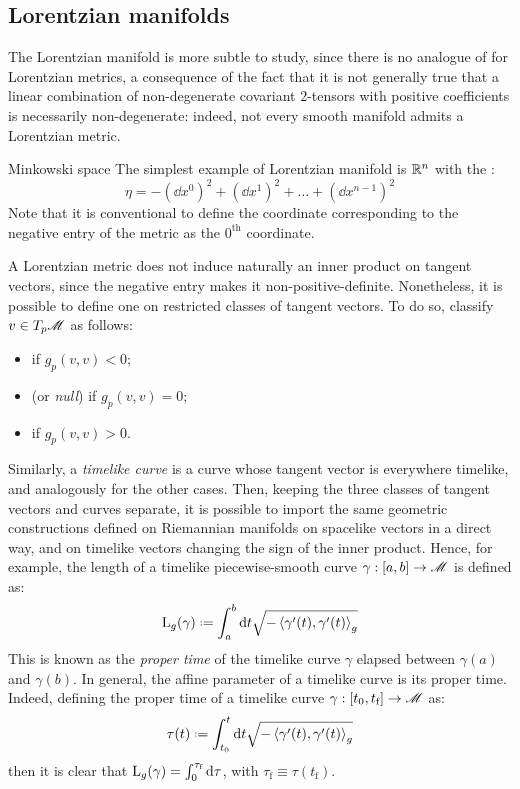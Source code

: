 \subsection{Lorentzian manifolds}

The Lorentzian manifold is more subtle to study, since there is no analogue of  for Lorentzian metrics, a consequence of the fact that it is not generally true that a linear combination of non-degenerate covariant $ 2 $-tensors with positive coefficients is necessarily non-degenerate: indeed, not every smooth manifold admits a Lorentzian metric.

\begin{example}{Minkowski space}{}
  The simplest example of Lorentzian manifold is $ \mathbb{R}^n $ with the :
  \begin{equation}
    \eta = - (\dd x^0)^2 + (\dd x^1)^2 + \dots + (\dd x^{n-1})^2
  \end{equation}
  Note that it is conventional to define the coordinate corresponding to the negative entry of the metric as the $ 0^\text{th} $ coordinate.
\end{example}

A Lorentzian metric does not induce naturally an inner product on tangent vectors, since the negative entry makes it non-positive-definite. Nonetheless, it is possible to define one on restricted classes of tangent vectors. To do so, classify $ v \in T_p\mathscr{M} $ as follows:
\begin{itemize}
  \item {} if $ g_p(v,v) < 0 $;
  \item {} (or \emph{null}) if $ g_p(v,v) = 0 $;
  \item {} if $ g_p(v,v) > 0 $.
\end{itemize}
Similarly, a \emph{timelike curve} is a curve whose tangent vector is everywhere timelike, and analogously for the other cases. Then, keeping the three classes of tangent vectors and curves separate, it is possible to import the same geometric constructions defined on Riemannian manifolds on spacelike vectors in a direct way, and on timelike vectors changing the sign of the inner product. Hence, for example, the length of a timelike piecewise-smooth curve $ \gamma : [a,b] \rightarrow \mathscr{M} $ is defined as:
\begin{equation*}
  \lng_g(\gamma) \defeq \int_a^b \dd t \sqrt{- \braket{\gamma'(t) , \gamma'(t)}_g}
\end{equation*}
This is known as the \emph{proper time} of the timelike curve $ \gamma $ elapsed between $ \gamma(a) $ and $ \gamma(b) $. In general, the affine parameter of a timelike curve is its proper time. Indeed, defining the proper time of a timelike curve $ \gamma : [t_0,t_\text{f}] \rightarrow \mathscr{M} $ as:
\begin{equation}
  \tau(t) \defeq \int_{t_0}^t \dd t \sqrt{-\braket{\gamma'(t) , \gamma'(t)}_g}
\end{equation}
then it is clear that $ \mathrm{L}_g(\gamma) = \int_0^{\tau_\text{f}} \mathrm{d} \tau $, with $ \tau_\text{f} \equiv \tau(t_\text{f}) $.

